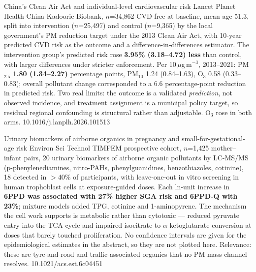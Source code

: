 \documentclass[10pt]{article}
\begin{document}

{China's Clean Air Act and individual-level cardiovascular risk}
{Lancet Planet Health}
{China Kadoorie Biobank, $n$=34{,}862 CVD-free at baseline, mean age 51.3, split into
intervention ($n$=25{,}497) and control ($n$=9{,}365) by the local government's PM
reduction target under the 2013 Clean Air Act, with 10-year predicted CVD risk as the
outcome and a difference-in-differences estimator. The intervention group's predicted
risk rose \textbf{3.95\% (3.18--4.72) less} than control, with larger differences under
stricter enforcement. Per 10\,$\mu$g\,m$^{-3}$, 2013--2021: PM$_{2.5}$ \textbf{1.80
(1.34--2.27)} percentage points, PM$_{10}$ 1.24 (0.84--1.63), O$_3$ 0.58 (0.33--0.83);
overall pollutant change corresponded to a 6.6 percentage-point reduction in predicted
risk. Two real limits: the outcome is a validated \emph{prediction}, not observed
incidence, and treatment assignment is a municipal policy target, so residual regional
confounding is structural rather than adjustable. O$_3$ rose in both arms.}
{10.1016/j.lanplh.2026.101513}


{Urinary biomarkers of airborne organics in pregnancy and small-for-gestational-age risk}
{Environ Sci Technol}
{TIMFEM prospective cohort, $n$=1{,}425 mother--infant pairs, 20 urinary biomarkers of
airborne organic pollutants by LC-MS/MS (p-phenylenediamines, nitro-PAHs,
phenylguanidines, benzothiazoles, cotinine), 18 detected in $>$40\% of participants, with
leave-one-out in vitro screening in human trophoblast cells at exposure-guided doses.
Each ln-unit increase in \textbf{6PPD was associated with 27\% higher SGA risk and 6PPD-Q
with 23\%}; mixture models added TPG, cotinine and 1-aminopyrene. The mechanism the cell
work supports is metabolic rather than cytotoxic --- reduced pyruvate entry into the TCA
cycle and impaired isocitrate-to-$\alpha$-ketoglutarate conversion at doses that barely
touched proliferation. No confidence intervals are given for the epidemiological
estimates in the abstract, so they are not plotted here. Relevance: these are
tyre-and-road and traffic-associated organics that no PM mass channel resolves.}
{10.1021/acs.est.6c04451}

\end{document}
